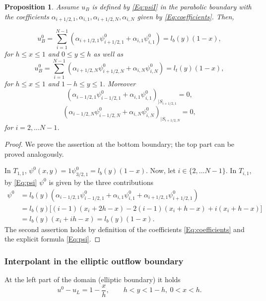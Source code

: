 \documentclass{article}
\newtheorem{propo}[thm]{Proposition}
\begin{document}
\begin{propo}\label{Propo:6}
Assume $u_B$ is defined by \eqref{Eq:psiI} in the parabolic boundary with the coefficients  
$\alpha_{i+1/2,1}, \alpha_{i,1}, \alpha_{i+1/2,N}, \alpha_{i,N}$ given by 
\eqref{Eq:coefficients}. Then,

$$
u_B^0 = \sum_{i=1}^{N-1} (\alpha_{i+1/2,1}\psi^0_{i+1/2,1} + \alpha_{i,1}\psi^0_{i,1}) = l_b(y)(1-x),
$$
for $h\leq x \leq 1$ and $0\leq y \leq h$
as well as 
$$
u_B^0 = \sum_{i=1}^{N-1} (\alpha_{i+1/2,N}\psi^0_{i+1/2,N} + \alpha_{i,N}\psi^0_{i,N}) = l_t(y)(1-x),
$$
for $h\leq x \leq 1$ and $1-h\leq y \leq 1$. Moreover
$$
(\alpha_{i-1/2,1}\psi^0_{i-1/2,1} + \alpha_{i,1}\psi^0_{i,1})_{|S_{i+1/2,1}} = 0,
$$
$$
(\alpha_{i-1/2,N}\psi^0_{i-1/2,N} + \alpha_{i,N}\psi^0_{i,N})_{|S_{i+1/2,N}} = 0,
$$
for $i=2,\dots N-1$.
\end{propo}

\begin{proof}
We prove the assertion at the bottom boundary; the top part can be proved analogously.

In $T_{1,1}$, $\psi^0(x,y) = 1 \psi^0_{3/2,1} = l_b(y)(1-x)$.
Now, let $i\in\{2,\dots N-1\}$. In $T_{i,1}$, by \eqref{Eq:psi} $\psi^0$  is given by the three contributions
$$
\begin{aligned}
  \psi^0 &= l_b(y)(\alpha_{i-1/2,1}\psi^0_{i-1/2,1} + \alpha_{i,1}\psi^0_{i,1} + \alpha_{i+1/2,1}\psi^0_{i+1/2,1}) \\
   & = l_b(y)\big[(i-1)(x_i + 2h -x) -2(i-1)(x_i+h-x) + i(x_i+h-x)\big] \\
   & = l_b(y)(x_i + ih -x) = l_b(y)(1-x).
\end{aligned}
$$
The second assertion holds by definition of the coefficients \eqref{Eq:coefficients} and the explicit
formula \eqref{Eq:psi}.
\end{proof}

\bigskip
\subsubsection{Interpolant in the elliptic outflow boundary}\label{Sec:elliptic}

At the left part of the domain (elliptic boundary)
it holds
$$
u^0 - u_L = 1-\frac{x}{h}, \qquad h < y < 1-h, \ 0 < x < h.
$$

\end{document}
